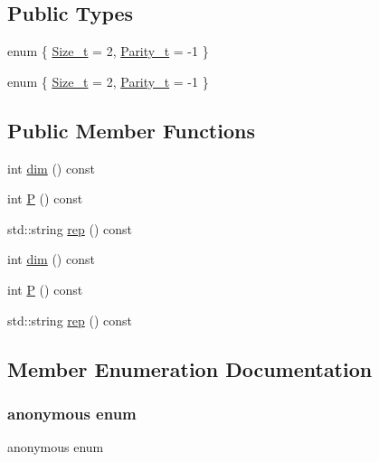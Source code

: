 \subsection*{Public Types}
\begin{DoxyCompactItemize}
\item 
enum \{ \mbox{\hyperlink{structHadron_1_1J1o2uRep_a75b636fc688d4ec55a370e35e3f6891faa30c1a7df3bbc1c0e0de5457a630f573}{Size\+\_\+t}} = 2, 
\mbox{\hyperlink{structHadron_1_1J1o2uRep_a75b636fc688d4ec55a370e35e3f6891fad584f6731842b6c742c10ec609e1ab18}{Parity\+\_\+t}} = -\/1
 \}
\item 
enum \{ \mbox{\hyperlink{structHadron_1_1J1o2uRep_a75b636fc688d4ec55a370e35e3f6891faa30c1a7df3bbc1c0e0de5457a630f573}{Size\+\_\+t}} = 2, 
\mbox{\hyperlink{structHadron_1_1J1o2uRep_a75b636fc688d4ec55a370e35e3f6891fad584f6731842b6c742c10ec609e1ab18}{Parity\+\_\+t}} = -\/1
 \}
\end{DoxyCompactItemize}
\subsection*{Public Member Functions}
\begin{DoxyCompactItemize}
\item 
int \mbox{\hyperlink{structHadron_1_1J1o2uRep_af458dec9c63e12a6d09f6a389bf8ad15}{dim}} () const
\item 
int \mbox{\hyperlink{structHadron_1_1J1o2uRep_a2babc8719f93a2e2b7fa74c30f3d1b67}{P}} () const
\item 
std\+::string \mbox{\hyperlink{structHadron_1_1J1o2uRep_af553ca15778c740b311c7305ade44c66}{rep}} () const
\item 
int \mbox{\hyperlink{structHadron_1_1J1o2uRep_af458dec9c63e12a6d09f6a389bf8ad15}{dim}} () const
\item 
int \mbox{\hyperlink{structHadron_1_1J1o2uRep_a2babc8719f93a2e2b7fa74c30f3d1b67}{P}} () const
\item 
std\+::string \mbox{\hyperlink{structHadron_1_1J1o2uRep_af553ca15778c740b311c7305ade44c66}{rep}} () const
\end{DoxyCompactItemize}


\subsection{Member Enumeration Documentation}
\mbox{\label{structHadron_1_1J1o2uRep_a8ff214f878d30ec1fec7bd396e8f5c81}} 
\subsubsection{\texorpdfstring{anonymous enum}{anonymous enum}}
{\footnotesize\ttfamily anonymous enum}

